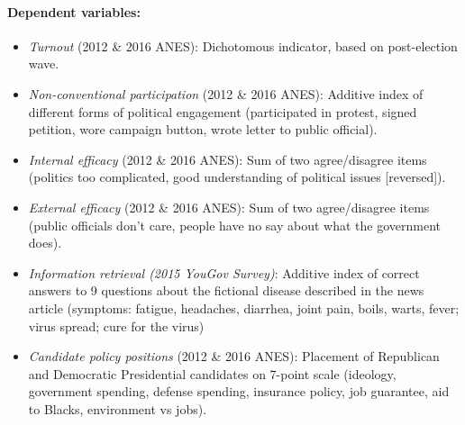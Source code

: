 \paragraph{Dependent variables:}
\begin{itemize}
\item \textit{Turnout} (2012 \& 2016 ANES): Dichotomous indicator, based on post-election wave.
\item \textit{Non-conventional participation} (2012 \& 2016 ANES): Additive index of different forms of political engagement (participated in protest, signed petition, wore campaign button, wrote letter to public official).
\item \textit{Internal efficacy} (2012 \& 2016 ANES): Sum of two agree/disagree items (politics too complicated, good understanding of political issues [reversed]).
\item \textit{External efficacy} (2012 \& 2016 ANES): Sum of two agree/disagree items (public officials don't care, people have no say about what the government does).
\item \textit{Information retrieval (2015 YouGov Survey)}: Additive index of correct answers to 9 questions about the fictional disease described in the news article (symptoms: fatigue, headaches, diarrhea, joint pain, boils, warts, fever; virus spread; cure for the virus)
\item \textit{Candidate policy positions} (2012 \& 2016 ANES): Placement of Republican and Democratic Presidential candidates on 7-point scale (ideology, government spending, defense spending, insurance policy, job guarantee, aid to Blacks, environment vs jobs).
\end{itemize}

